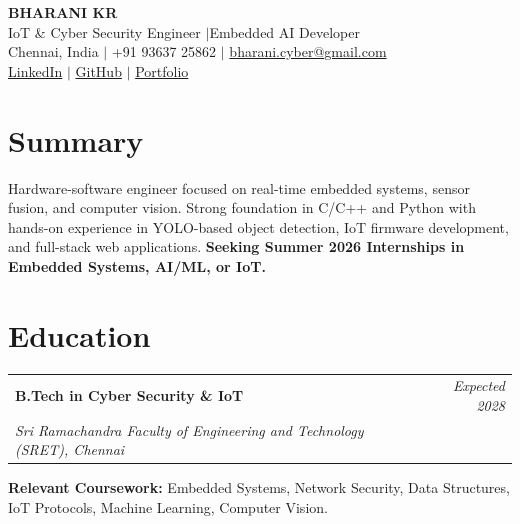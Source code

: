 \documentclass[a4paper,11pt]{article}
\makeatletter
\newcommand{\resumeSubheading}[4]{
  \vspace{2pt}\noindent
  \begin{tabularx}{\textwidth}{@{}X r@{}}
    \textbf{#1} & \textit{\small #2} \\
    \textit{\small #3} & \textit{\small #4}
  \end{tabularx}
  \vspace{-3pt}
}
\makeatother
\begin{document}
\noindent
\begin{minipage}[c]{0.15\textwidth}
\end{minipage}%
\begin{minipage}[c]{0.7\textwidth}
  \centering
  {\LARGE\bfseries BHARANI KR} \\[3pt]
  {\small IoT \& Cyber Security Engineer \enspace$|$\enspace Embedded AI Developer} \\[4pt]
  {\small
    Chennai, India \enspace$|$\enspace
    +91 93637 25862 \enspace$|$\enspace
    \href{mailto:bharani.cyber@gmail.com}{bharani.cyber@gmail.com} \\[2pt]
    \href{https://linkedin.com/in/bharani-k-r-45a950354}{LinkedIn} \enspace$|$\enspace
    \href{https://github.com/bharani-01}{GitHub} \enspace$|$\enspace
    \href{https://bharani01.netlify.app}{Portfolio}
  }
\end{minipage}%
\begin{minipage}[c]{0.15\textwidth}
  \begin{flushright}
  \end{flushright}
\end{minipage}

\vspace{-6pt}

\section{Summary}
{\small Hardware-software engineer focused on real-time embedded systems, sensor fusion, and computer vision. Strong foundation in C/C++ and Python with hands-on experience in YOLO-based object detection, IoT firmware development, and full-stack web applications. \textbf{Seeking Summer 2026 Internships in Embedded Systems, AI/ML, or IoT.}}

\section{Education}
\resumeSubheading
  {B.Tech in Cyber Security \& IoT}
  {Expected 2028}
  {Sri Ramachandra Faculty of Engineering and Technology (SRET), Chennai}
  {}

\vspace{-1pt}
{\footnotesize\textbf{Relevant Coursework:} Embedded Systems, Network Security, Data Structures, IoT Protocols, Machine Learning, Computer Vision.}
\end{document}
